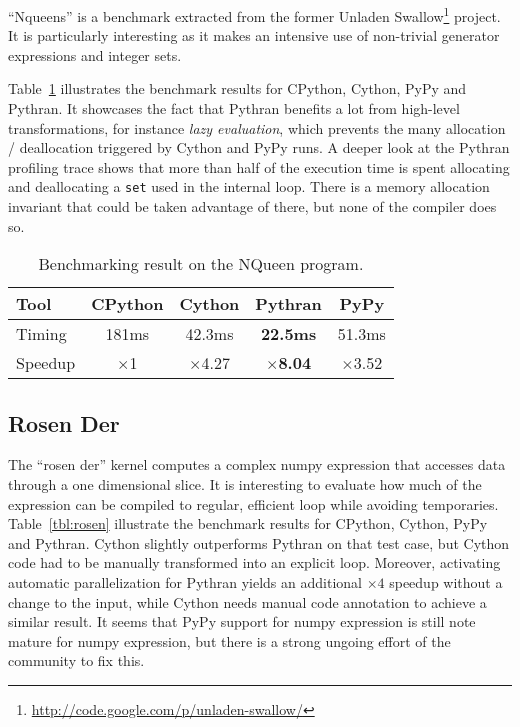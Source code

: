 \documentclass[10pt, onecolumn, preprint]{sigplanconf}
\begin{document}
``Nqueens'' is a benchmark extracted from the former Unladen
Swallow\footnote{\url{http://code.google.com/p/unladen-swallow/}} project. It
is particularly interesting as it makes an intensive use of non-trivial
generator expressions and integer sets.

Table~\ref{tbl:nqueen} illustrates the benchmark results for CPython, Cython,
PyPy and Pythran.  It showcases the fact that Pythran benefits a lot from
high-level transformations, for instance \emph{lazy evaluation}, which prevents
the many allocation / deallocation triggered by Cython and PyPy runs.  A deeper
look at the Pythran profiling trace shows that more than half of the execution
time is spent allocating and deallocating a \texttt{set} used in the internal
loop. There is a memory allocation invariant that could be taken advantage of
there, but none of the compiler does so.

\begin{table}
    \centering

    \begin{tabular}{|l|c|c|c|c|}
        \hline
     Tool    &  CPython    &   Cython     &     Pythran   &  PyPy \\
    \hline
    Timing  &  181ms   &   42.3ms     &    \textbf{22.5ms} &  51.3ms  \\
    \hline
    Speedup &  $\times$1         &    $\times$4.27      &    \textbf{$\times$8.04}   &  $\times$3.52    \\
    \hline
\end{tabular}
\caption{Benchmarking result on the NQueen program.}
\label{tbl:nqueen}

\end{table}

\subsection{Rosen Der}

The ``rosen der'' kernel computes a complex numpy expression that accesses
data through a one dimensional slice. It is interesting to evaluate how much of
the expression can be compiled to regular, efficient loop while avoiding
temporaries.  Table~\ref{tbl:rosen} illustrate the benchmark results for
CPython, Cython, PyPy and Pythran. Cython slightly outperforms Pythran on that
test case, but Cython code had to be manually transformed into an explicit
loop. Moreover, activating automatic parallelization for Pythran yields an
additional $\times4$ speedup without a change to the input, while Cython needs
manual code annotation to achieve a similar result. It seems that PyPy support
for numpy expression is still note mature for numpy expression, but there is a
strong ungoing effort of the community to fix this.
\end{document}
